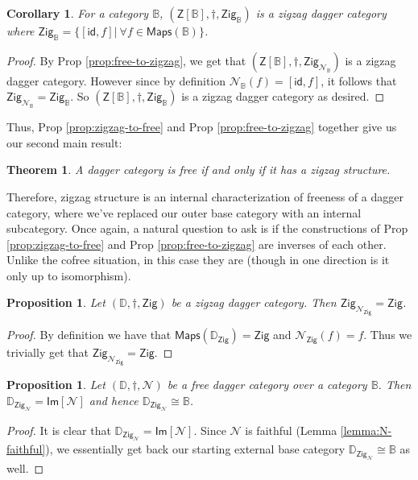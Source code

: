 \documentclass[10pt]{article}
\newtheorem{theorem}[observation]{Theorem}
\newtheorem{proposition}[observation]{Proposition}
\newtheorem{corollary}[observation]{Corollary}
\begin{document}
\begin{corollary} For a category $\mathbb{B}$, $(\mathsf{Z}[\mathbb{B}], \dagger, \mathsf{Zig}_\mathbb{B})$ is a zigzag dagger category where $\mathsf{Zig}_\mathbb{B} = \lbrace [\mathsf{id},f] \vert~ \forall f \in \mathsf{Maps}(\mathbb{B}) \rbrace$.
\end{corollary}
\begin{proof} By Prop \ref{prop:free-to-zigzag}, we get that $(\mathsf{Z}[\mathbb{B}], \dagger, \mathsf{Zig}_{\mathcal{N}_\mathbb{B}})$ is a zigzag dagger category. However since by definition $\mathcal{N}_\mathbb{B}(f) = [\mathsf{id},f]$, it follows that $\mathsf{Zig}_{\mathcal{N}_\mathbb{B}}=\mathsf{Zig}_\mathbb{B}$. So $(\mathsf{Z}[\mathbb{B}], \dagger, \mathsf{Zig}_\mathbb{B})$ is a zigzag dagger category as desired. 
\end{proof}

Thus, Prop \ref{prop:zigzag-to-free} and Prop \ref{prop:free-to-zigzag} together give us our second main result:  

\begin{theorem}\label{thm:free=zigzag} A dagger category is free if and only if it has a zigzag structure. 
\end{theorem}

Therefore, zigzag structure is an internal characterization of freeness of a dagger category, where we've replaced our outer base category with an internal subcategory. Once again, a natural question to ask is if the constructions of Prop \ref{prop:zigzag-to-free} and Prop \ref{prop:free-to-zigzag} are inverses of each other. Unlike the cofree situation, in this case they are (though in one direction is it only up to isomorphism). 

\begin{proposition} Let $(\mathbb{D}, \dagger, \mathsf{Zig})$ be a zigzag dagger category. Then $\mathsf{Zig}_{\mathcal{N}_{\mathsf{Zig}}}= \mathsf{Zig}$.
\end{proposition}
\begin{proof} By definition we have that $\mathsf{Maps}(\mathbb{D}_\mathsf{Zig}) = \mathsf{Zig}$ and $\mathcal{N}_{\mathsf{Zig}}(f)=f$. Thus we trivially get that $\mathsf{Zig}_{\mathcal{N}_{\mathsf{Zig}}}= \mathsf{Zig}$. 
\end{proof}

\begin{proposition} Let $(\mathbb{D},\dagger, \mathcal{N})$ be a free dagger category over a category $\mathbb{B}$. Then $\mathbb{D}_{\mathsf{Zig}_\mathcal{N}} = \mathsf{Im}[\mathcal{N}]$ and hence $\mathbb{D}_{\mathsf{Zig}_\mathcal{N}} \cong \mathbb{B}$. 
\end{proposition}
\begin{proof} It is clear that $\mathbb{D}_{\mathsf{Zig}_\mathcal{N}} = \mathsf{Im}[\mathcal{N}]$. Since $\mathcal{N}$ is faithful (Lemma \ref{lemma:N-faithful}), we essentially get back our starting external base category $\mathbb{D}_{\mathsf{Zig}_\mathcal{N}} \cong \mathbb{B}$ as well. 
\end{proof}
\end{document}
